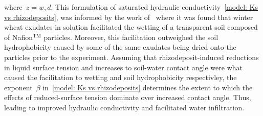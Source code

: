 \documentclass[11pt,a4paper]{article}
\numberwithin{equation}{section}
\begin{document}
where~$z=w,d$. This formulation of saturated hydraulic conductivity~\eqref{model: Ks vs rhizodeposits}, was informed by the work of~\cite{gomez2025exudates} where it was found that winter wheat exudates in solution facilitated the wetting of a transparent soil composed of Nafion$^{\text{TM}}$ particles. Moreover, this facilitation outweighed the soil hydrophobicity caused by some of the same exudates being dried onto the particles prior to the experiment. Assuming that rhizodeposit-induced reductions in liquid surface tension  and increases to soil-water contact angle were what caused the facilitation to wetting and soil hydrophobicity respectivley, the exponent~$\beta$ in~\eqref{model: Ks vs rhizodeposits} determines the extent to which the effects of reduced-surface tension dominate over increased contact angle. Thus, leading to improved hydraulic conductivity and facilitated water infiltration.
\end{document}
